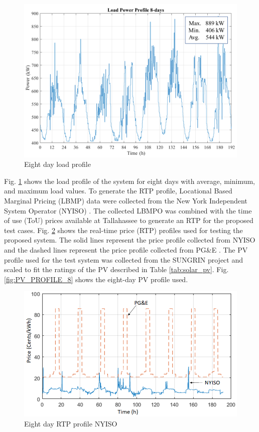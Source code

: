 \begin{figure}[!ht]
    \centering
    \includegraphics[width = \linewidth]{figs/loadprofile.png}
    \caption{Eight day load profile}
    \label{fig:LOAD_PROFILE_8}
\end{figure}


Fig. \ref{fig:LOAD_PROFILE_8} shows the load profile of the system for eight days with average, minimum, and maximum load values. To generate the RTP profile, Locational Based Marginal Pricing (LBMP) data were collected from the New York Independent System Operator (NYISO) \cite{NYISO2017}. The collected LBMPO was combined with the time of use (ToU) prices available at Tallahassee to generate an RTP for the proposed test cases. Fig. \ref{fig:RTP_PROFILE_8} shows the real-time price (RTP) profiles used for testing the proposed system. The solid lines represent the price profile collected from NYISO and the dashed lines represent the price profile collected from PG\&E \cite{pgne}. The PV profile used for the test system was collected from the SUNGRIN project and scaled to fit the ratings of the PV described in Table \ref{tab:solar_pv}. Fig. \ref{fig:PV_PROFILE_8} shows the eight-day PV profile used.



\begin{figure}[!ht]
    \centering
    \includegraphics[width = \linewidth]{figs/Price_profiles.png}
    \caption{Eight day RTP profile NYISO}
    \label{fig:RTP_PROFILE_8}
\end{figure}

